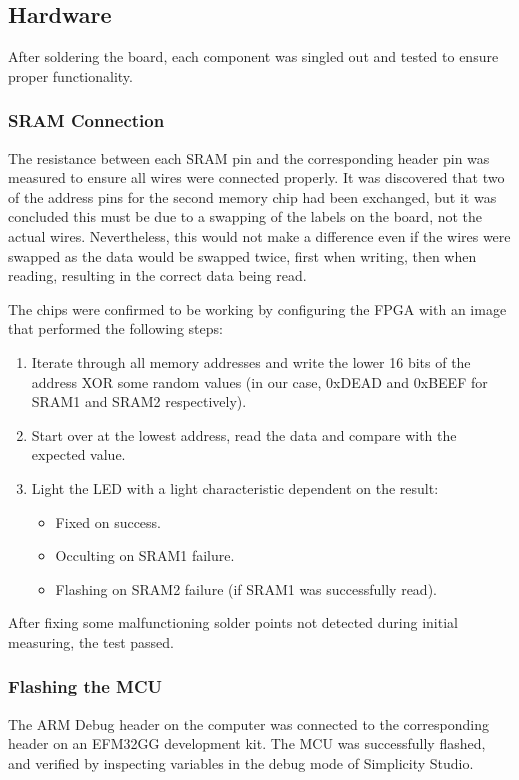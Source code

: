 \subsection{Hardware}
After soldering the board, each component was singled out and tested to ensure proper functionality.

\subsubsection{SRAM Connection}
The resistance between each SRAM pin and the corresponding header pin was measured to ensure all wires were connected properly.
It was discovered that two of the address pins for the second memory chip had been exchanged, but it was concluded this must be due to a swapping of the labels on the board, not the actual wires.
Nevertheless, this would not make a difference even if the wires were swapped as the data would be swapped twice, first when writing, then when reading, resulting in the correct data being read.

The chips were confirmed to be working by configuring the FPGA with an image that performed the following steps:
\begin{enumerate}
    \item Iterate through all memory addresses and write the lower 16 bits of the address XOR some random values (in our case, 0xDEAD and 0xBEEF for SRAM1 and SRAM2 respectively).
    \item Start over at the lowest address, read the data and compare with the expected value.
    \item Light the LED with a light characteristic dependent on the result:
        \begin{itemize}
            \item Fixed on success.
            \item Occulting on SRAM1 failure.
            \item Flashing on SRAM2 failure (if SRAM1 was successfully read).
        \end{itemize}
\end{enumerate}

After fixing some malfunctioning solder points not detected during initial measuring, the test passed.

\subsubsection{Flashing the MCU}
The ARM Debug header on the computer was connected to the corresponding header on an EFM32GG development kit. The MCU was successfully flashed, and verified by inspecting variables in the debug mode of Simplicity Studio.

